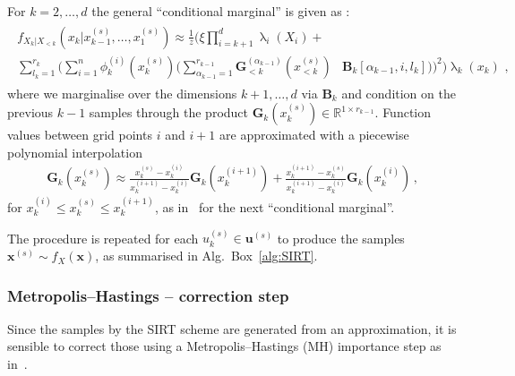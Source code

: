 For $k = 2, \dots,d$ the general ``conditional marginal'' is given as \cite[Eq.~31]{cui2022deep}:
\begin{align}\begin{split} 
		f_{X_k|X_{<k}}(x_k|x^{(s)}_{k-1},\dots,x^{(s)}_1) \approx \frac{1}{z}
		\Bigg( 
		\xi \prod_{i=k+1}^{d} \uplambda_i(X_i) +&  \\
		\sum_{l_{k} = 1}^{r_{k}} \Bigg( \sum_{i = 1}^{n}  \phi^{(i)}_k(x^{(s)}_k) \bigg( \sum_{\alpha_{k-1} = 1}^{r_{k-1}} \bm{G}^{(\alpha_{k-1})}_{<k}(x^{(s)}_{<k}) &\bm{B}_k[\alpha_{k-1},i,l_k] \bigg) \Bigg)^2 \Bigg) \uplambda_k(x_k) \, \,  ,
	\end{split} 
	\label{eq:CurrMarg} 
\end{align}
where we marginalise over the dimensions $k+1 , \dots, d$ via $\bm{B}_k$ and condition on the previous $k-1$ samples through the product $\bm{G}_k(x^{(s)}_k)\in \mathbb{R}^{1 \times r_{k-1}}$. 
Function values between grid points $i$ and $i+1$ are approximated with a piecewise polynomial interpolation
\begin{align}
	\bm{G}_k(x^{(s)}_k) \approx   \frac{x^{(s)}_k - x^{(i)}_k }{x^{(i+1)}_k -x^{(i)}_k } \bm{G}_k(x^{(i+1)}_k) + \frac{ x^{(i+1)}_k - x^{(s)}_k}{x^{(i+1)}_k -x^{(i)}_k } \bm{G}_k(x^{(i)}_k) \, ,
	\label{eq:LinPol}
\end{align}
for $x^{(i)}_k \leq x^{(s)}_k \leq x^{(i+1)}_k$, as in~\cite{dolgov2020approximation} for the next ``conditional marginal''.

The procedure is repeated for each $u^{(s)}_k \in \bm{u}^{(s)}$ to produce the samples $\bm{x}^{(s)} \sim f_{X}(\bm{x})$, as summarised in Alg.~Box~\ref{alg:SIRT}.%



\subsubsection{Metropolis--Hastings -- correction step}
Since the samples by the SIRT scheme are generated from an approximation, it is sensible to correct those using a Metropolis--Hastings (MH) importance step as in~\cite{dolgov2020approximation}.

